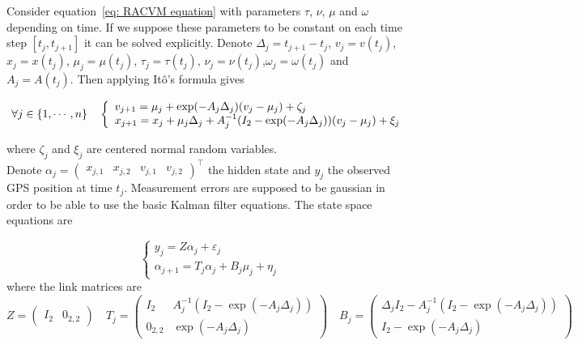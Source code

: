 \documentclass[11pt]{article}
\newcommand {\1}{\mathbb{1}}
\begin{document}
Consider equation~\ref{eq: RACVM equation} with parameters $\tau$, $\nu$, $\mu$ and $\omega$ depending on time.
If we suppose these parameters to be constant on each time step $[t_j,t_{j+1}]$ it can be solved explicitly. Denote $\Delta_j=t_{j+1}-t_j$, $v_j=v(t_j)$, $x_j=x(t_j)$, $\mu_j=\mu(t_j)$, $\tau_j=\tau(t_j)$, $\nu_j=\nu(t_j)$,$\omega_j=\omega(t_j)$ and $A_j=A(t_j)$. Then applying Itô's formula gives

\begin{equation}
	\forall j \in \{1, \cdots, n\} \quad 
	\left\{ \begin{array}{l}
		v_{j+1}=\mu_j +\exp(-A_j\Delta_j)(v_j-\mu_j)+\zeta_j \\
		x_{j+1}=x_j+\mu_j \Delta_j+A_j^{-1}(I_2-\exp(-A_j\Delta_j))(v_j-\mu_j)+\xi_j
	\end{array}\right. \\
	\label{eq: RCVM autoregressive formula}
\end{equation}


where $\zeta_j$ and $\xi_j$ are centered normal random variables.\\
Denote $\alpha_j=\begin{pmatrix} x_{j,1}  & x_{j,2} & v_{j,1} & v_{j,2}\end{pmatrix}^\top$ the hidden state and $y_j$ the observed GPS position at time $t_j$. Measurement errors are supposed to be gaussian in order to be able to use the basic Kalman filter equations. The state space equations are

\[
\left\{
\begin{array}{l}
	y_j=Z\alpha_j+\varepsilon_j \\
	\alpha_{j+1}=T_j \alpha_j+B_j \mu_j + \eta_j
\end{array}
\right.\]
where the link matrices are 
\[Z=\begin{pmatrix} I_2 & 0_{2,2}\end{pmatrix} \quad  T_j=\begin{pmatrix} I_2 & A_j^{-1}(I_2-\exp(-A_j \Delta_j)) \\ 0_{2,2} & \exp(-A_j \Delta_j) \end{pmatrix} \quad B_j=\begin{pmatrix}
	\Delta_j I_2-A_j^{-1}(I_2-\exp(-A_j\Delta_j)) \\
	I_2-\exp(-A_j\Delta_j)\end{pmatrix}
\]
\end{document}
